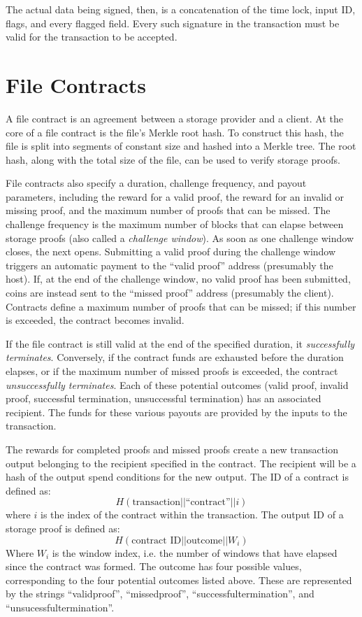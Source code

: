 \documentclass[twocolumn]{article}
\begin{document}
The actual data being signed, then, is a concatenation of the time lock, input ID, flags, and every flagged field.
Every such signature in the transaction must be valid for the transaction to be accepted.

\section{File Contracts}
\label{sec:contracts}
A file contract is an agreement between a storage provider and a client.
At the core of a file contract is the file's Merkle root hash.
To construct this hash, the file is split into segments of constant size and hashed into a Merkle tree.
The root hash, along with the total size of the file, can be used to verify storage proofs.

File contracts also specify a duration, challenge frequency, and payout parameters, including the reward for a valid proof, the reward for an invalid or missing proof, and the maximum number of proofs that can be missed.
The challenge frequency is the maximum number of blocks that can elapse between storage proofs (also called a \textit{challenge window}).
As soon as one challenge window closes, the next opens.
Submitting a valid proof during the challenge window triggers an automatic payment to the ``valid proof'' address (presumably the host).
If, at the end of the challenge window, no valid proof has been submitted, coins are instead sent to the ``missed proof'' address (presumably the client).
Contracts define a maximum number of proofs that can be missed; if this number is exceeded, the contract becomes invalid.

If the file contract is still valid at the end of the specified duration, it \textit{successfully terminates}.
Conversely, if the contract funds are exhausted before the duration elapses, or if the maximum number of missed proofs is exceeded, the contract \textit{unsuccessfully terminates}.
Each of these potential outcomes (valid proof, invalid proof, successful termination, unsuccessful termination) has an associated recipient.
The funds for these various payouts are provided by the inputs to the transaction.

The rewards for completed proofs and missed proofs create a new transaction output belonging to the recipient specified in the contract.
The recipient will be a hash of the output spend conditions for the new output.
The ID of a contract is defined as:
\[
	H(\text{transaction} || \text{``contract''} || i)
\]
where $i$ is the index of the contract within the transaction.
The output ID of a storage proof is defined as:
\[
	H(\text{contract ID} || \text{outcome} || W_i)
\]
Where $W_i$ is the window index, i.e. the number of windows that have elapsed since the contract was formed.
The outcome has four possible values, corresponding to the four potential outcomes listed above.
These are represented by the strings ``validproof'', ``missedproof'', ``successfultermination'', and ``unsucessfultermination''.
\end{document}
